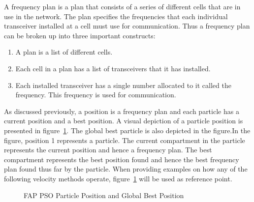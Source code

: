 A frequency plan is a plan that consists of a series of different cells that are in use in the network. The plan specifies the frequencies that each individual transceiver installed at a cell must use for communication. Thus a frequency plan can be broken up into three important constructs:
\begin{enumerate}
\item A plan is a list of different cells.
\item Each cell in a plan has a list of transceivers that it has installed.
\item Each installed transceiver has a single number allocated to it called the frequency. This frequency is used for communication.
\end{enumerate}

As discussed previously, a position is a frequency plan and each particle has a current position and a best position. A visual depiction of a particle position is presented in figure~\ref{fig:fapparticlepos}. The global best particle is also depicted in the figure.In the figure, position 1 represents a particle. The current compartment in the particle represents the current position and hence a frequency plan. The best compartment represents the best position found and hence the best frequency plan found thus far by the particle. When providing examples on how any of the following velocity methods operate, figure~\ref{fig:fapparticlepos} will be used as reference point.
\begin{figure}[ht]
	\centering
	\setlength \fboxsep{0pt}
	\setlength \fboxrule{0.5pt}
	\caption{FAP PSO Particle Position and Global Best Position}
	\label{fig:fapparticlepos}
\end{figure}

